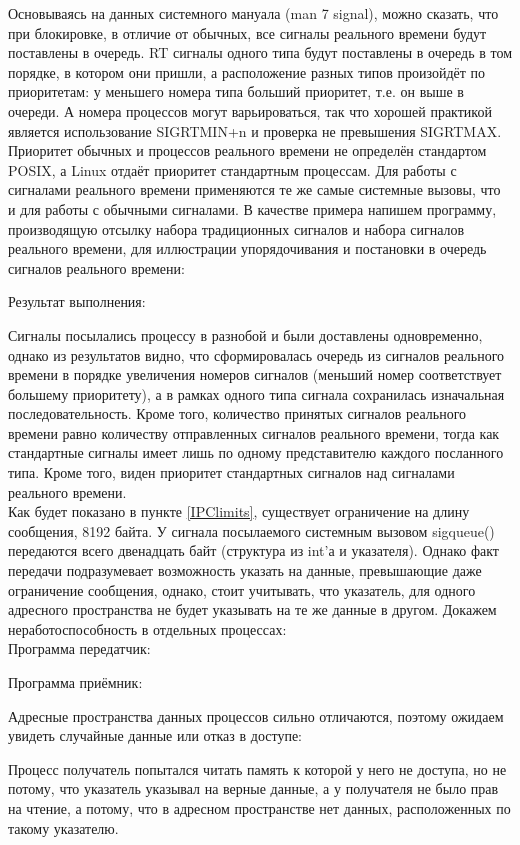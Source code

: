 \documentclass[a4paper]{article}
\begin{document}
	Основываясь на данных системного мануала (man 7 signal), можно сказать, что при блокировке, в отличие от обычных, все сигналы реального времени будут поставлены в очередь. RT сигналы одного типа будут поставлены в очередь в том порядке, в котором они пришли, а расположение разных типов произойдёт по приоритетам: у меньшего номера типа больший приоритет, т.е. он выше в очереди. А номера процессов могут варьироваться, так что хорошей практикой является использование SIGRTMIN+n и проверка не превышения SIGRTMAX. Приоритет обычных и процессов реального времени не определён стандартом POSIX, а Linux отдаёт приоритет стандартным процессам.
	Для работы с сигналами реального времени применяются те же самые системные вызовы, что и для работы с обычными сигналами. 
	В качестве примера напишем программу, производящую отсылку набора традиционных сигналов и набора сигналов реального времени, для иллюстрации упорядочивания и постановки в очередь сигналов реального времени:

	
	
	Результат выполнения:
	

	Сигналы посылались процессу в разнобой и были доставлены одновременно, однако из результатов видно, что сформировалась очередь из сигналов реального времени в порядке увеличения номеров сигналов (меньший номер соответствует большему приоритету), а в рамках одного типа сигнала сохранилась изначальная последовательность.  Кроме того, количество принятых сигналов реального времени равно количеству отправленных сигналов реального времени, тогда как стандартные сигналы имеет лишь по одному представителю каждого посланного типа. Кроме того, виден приоритет стандартных сигналов над сигналами реального времени.\\
	
	Как будет показано в пункте \ref{IPClimits}, существует ограничение на длину сообщения, 8192 байта. У сигнала посылаемого системным вызовом sigqueue() передаются всего двенадцать байт (структура из int'а и указателя). Однако факт передачи подразумевает возможность указать на данные, превышающие даже ограничение сообщения, однако, стоит учитывать, что указатель, для одного адресного пространства не будет указывать на те же данные в другом. Докажем неработоспособность в отдельных процессах:\\
	Программа передатчик:
	
	Программа приёмник:
	
	Адресные пространства данных процессов сильно отличаются, поэтому ожидаем увидеть случайные данные или отказ в доступе:
	
	Процесс получатель попытался читать память к которой у него не доступа, но не потому, что указатель указывал на верные данные, а у получателя не было прав на чтение, а потому, что в адресном пространстве нет данных, расположенных по такому указателю.\\
	
\end{document}
